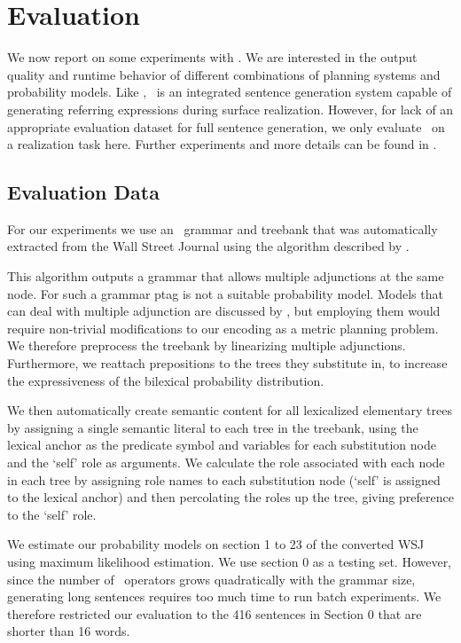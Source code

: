 \section{Evaluation}
\label{sec:experiments}

We now report on some experiments with \pcrisp. We are interested in the output quality and runtime behavior of different combinations of planning systems and probability models. Like \crisp, \pcrisp\ is an integrated sentence generation system capable of generating referring expressions during surface realization.  However, for lack of an appropriate evaluation dataset for full sentence generation, we only evaluate \pcrisp\ on a realization task here.  Further experiments and more details can be found in .

\subsection{Evaluation Data}
For our experiments we use an \ltag\ grammar and treebank that was automatically extracted from the Wall Street Journal using the algorithm described by .   

This algorithm outputs a grammar that allows multiple adjunctions at the same node. For such a grammar {\sc ptag} is not a suitable probability model. Models that can deal with multiple adjunction are discussed by , but employing them would require non-trivial modifications to our encoding as a metric planning problem. We therefore preprocess the treebank by linearizing multiple adjunctions. Furthermore, we reattach prepositions to the trees they substitute in, to increase the expressiveness of the bilexical probability distribution.

We then automatically create semantic content for all lexicalized elementary trees by assigning a single semantic literal to each tree in the treebank, using the lexical anchor as the predicate symbol and variables for each substitution node and the `self' role as arguments.  We calculate the role associated with each node in each tree by assigning role names to each substitution node (`self' is assigned to the lexical anchor) and then percolating the roles up the tree, giving preference to the `self' role.  

We estimate our probability models on section 1 to 23 of the converted WSJ using maximum likelihood estimation. We use section 0 as a testing set. However, since the number of \pcrisp\ operators grows quadratically with the grammar size, generating long sentences requires too much time to run batch experiments.  We therefore restricted our evaluation to the 416 sentences in Section 0 that are shorter than 16 words.

